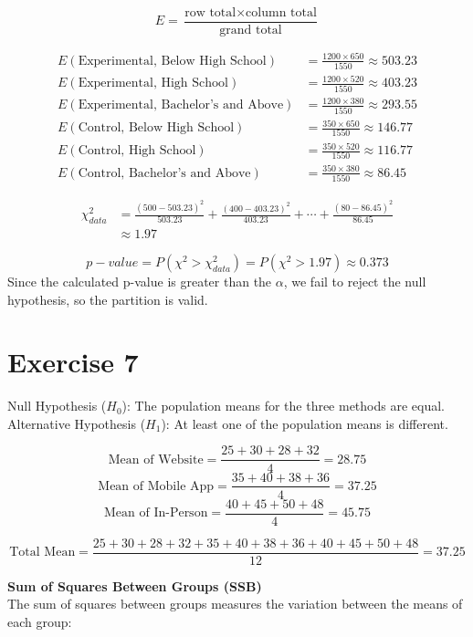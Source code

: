 \documentclass[12pt]{article}
\begin{document}
	\[
	E = \frac{\text{row total} \times \text{column total}}{\text{grand total}}
	\]
	

	\begin{align*}
		E(\text{Experimental, Below High School}) &= \frac{1200 \times 650}{1550} \approx 503.23 \\
		E(\text{Experimental, High School}) &= \frac{1200 \times 520}{1550} \approx 403.23 \\
		E(\text{Experimental, Bachelor's and Above}) &= \frac{1200 \times 380}{1550} \approx 293.55 \\
		E(\text{Control, Below High School}) &= \frac{350 \times 650}{1550} \approx 146.77 \\
		E(\text{Control, High School}) &= \frac{350 \times 520}{1550} \approx 116.77 \\
		E(\text{Control, Bachelor's and Above}) &= \frac{350 \times 380}{1550} \approx 86.45
	\end{align*}

	\begin{align*}
		\chi^2_{data} &= \frac{(500 - 503.23)^2}{503.23} + \frac{(400 - 403.23)^2}{403.23} + \cdots + \frac{(80 - 86.45)^2}{86.45} \\
		&\approx 1.97
	\end{align*}

	\[
	p-value = P(\chi^2 > \chi^2_{data}) = P(\chi^2 > 1.97) \approx 0.373
	\]
	Since the calculated p-value is greater than the $\alpha$, we fail to reject the null hypothesis, so the partition is valid.
		
	\section{Exercise 7}	
	Null Hypothesis ($H_0$): The population means for the three methods are equal. \\
	Alternative Hypothesis ($H_1$): At least one of the population means is different.

	\[
	\text{Mean of Website} = \frac{25 + 30 + 28 + 32}{4} = 28.75
	\]
	\[
	\text{Mean of Mobile App} = \frac{35 + 40 + 38 + 36}{4} = 37.25
	\]
	\[
	\text{Mean of In-Person} = \frac{40 + 45 + 50 + 48}{4} = 45.75
	\]
	
	\[
	\text{Total Mean} = \frac{25 + 30 + 28 + 32 + 35 + 40 + 38 + 36 + 40 + 45 + 50 + 48}{12} = 37.25
	\]

	\textbf{Sum of Squares Between Groups (SSB)}\\	
	The sum of squares between groups measures the variation between the means of each group:
	
\end{document}

